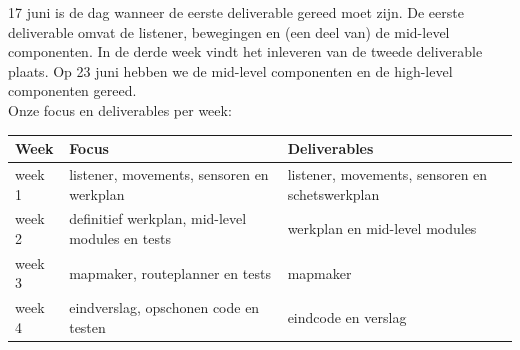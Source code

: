 \documentclass[a4paper,10pt]{article}
\begin{document}
17 juni is de dag wanneer de eerste deliverable gereed moet zijn. De eerste deliverable omvat de listener, bewegingen en (een deel van) de mid-level componenten. In de derde week vindt het inleveren van de tweede deliverable plaats. Op 23 juni hebben we de mid-level componenten en de high-level componenten gereed.\\
Onze focus en deliverables per week:\\
\begin{tabular}{|l|p{5cm}|p{5cm}|}
\hline
Week&Focus&Deliverables\\
\hline
week 1&listener, movements, sensoren en werkplan& listener, movements, sensoren en schetswerkplan \\ 
\hline
week 2&definitief werkplan, mid-level modules en tests& werkplan en mid-level modules\\
\hline
week 3&mapmaker, routeplanner en tests & mapmaker\\
\hline
week 4& eindverslag, opschonen code en testen& eindcode en verslag\\
\hline

\end{tabular}
\end{document}
